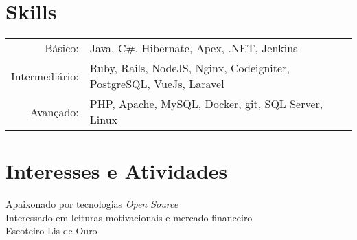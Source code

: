 \documentclass[a4paper,10pt]{article}
\begin{document}
\section{Skills}
\begin{tabular}{rl}
 Básico:& Java, C\#, Hibernate, Apex, .NET, Jenkins \setmainfont[SmallCapsFont=Fontin-SmallCaps.otf]{Fontin.otf}\\
 Intermediário:& Ruby, Rails, NodeJS, Nginx, Codeigniter, PostgreSQL, VueJs, Laravel \\
 Avançado:& PHP, Apache, MySQL, Docker, git, SQL Server, Linux
\end{tabular}

\section{Interesses e Atividades}
Apaixonado por tecnologias \textit{Open Source}\\
Interessado em leituras motivacionais e mercado financeiro\\
Escoteiro Lis de Ouro \\
\end{document}
